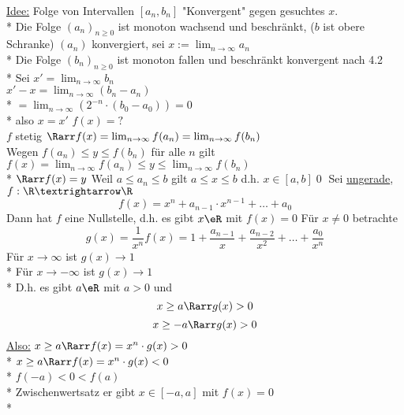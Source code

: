 \ul{Idee:} Folge von Intervallen $[a_n, b_n]$ "Konvergent" gegen gesuchtes $x$.\\*
	Die Folge $(a_n)_{n \geq 0}$ ist monoton wachsend und beschränkt, ($b$ ist obere Schranke) \Rarr $(a_n)$ konvergiert, sei $x:=\lim_{n \to \infty} a_n$\\*
	Die Folge $(b_n)_{n \geq 0}$ ist monoton fallen und beschränkt \Rarr konvergent nach 4.2\\*
	Sei $x' = \lim_{n \to \infty} b_n$\\
	$x' - x = \lim_{n \to \infty} (b_n - a_n)$\\*
	$= \lim_{n \to \infty} (2^{-n} \cdot (b_0 - a_0)) = 0$\\*
	also $x = x'$ $f(x) = ?$\\
	$f$ stetig $\Rarr f(x) = \lim_{n \to \infty} f(a_n) = \lim_{n \to \infty} f(b_n)$\\
	Wegen $f(a_n) \leq y \leq f(b_n)$ für alle $n$ gilt $f(x) = \lim_{n \to \infty} f(a_n) \leq y \leq \lim_{n \to \infty} f(b_n)$\\*
	$\Rarr f(x) = y$ 
%
\bem
Weil $a\leq a_n\leq b$ gilt $a\leq x\leq b$ d.h. $x\in[a,b]$\qed
{}
Sei \nN{} \ul{ungerade}, $f:\R→\R$
$$f(x)=x^n+a_{n-1}·x^{n-1}+…+a_0$$
Dann hat $f$ eine Nullstelle, d.h. es gibt $x\eR$ mit $f(x)=0$
\bew
Für $x\neq 0$ betrachte
$$g(x)=\frac{1}{x^n}f(x)=1+\frac{a_{n-1}}{x}+\frac{a_{n-2}}{x^2}+…+\frac{a_0}{x^n}$$
Für $x→∞$ ist $g(x)→1$\\*
Für $x→-∞$ ist $g(x)→1$\\*
D.h. es gibt $a\eR$ mit $a>0$ und
$$x\geq a \Rarr g(x)>0$$
$$x\geq -a \Rarr g(x)>0$$
%
\ul{Also:} $x \geq a \Rarr f(x) = x^n \cdot g(x) > 0$\\*
	$x \geq a \Rarr f(x) = x^n \cdot g(x) < 0$\\* %
	$f(-a) < 0 < f(a)$\\*
	Zwischenwertsatz \Rarr er gibt $x \in [-a, a]$ mit $f(x) = 0$\\*

